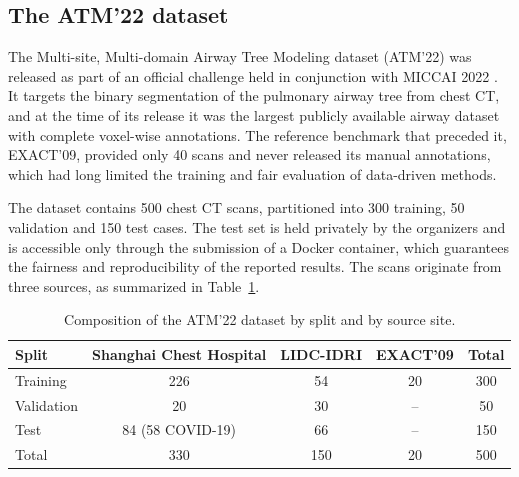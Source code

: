 
\subsection{The ATM'22 dataset}  %
\label{sec:atm22}                %

The Multi-site, Multi-domain Airway Tree Modeling dataset (ATM'22) was released
as part of an official challenge held in conjunction with MICCAI 2022
\cite{zhang2023atm22}. It targets the binary segmentation of the pulmonary
airway tree from chest CT, and at the time of its release it was the largest
publicly available airway dataset with complete voxel-wise annotations. The
reference benchmark that preceded it, EXACT'09, provided only 40 scans and
never released its manual annotations, which had long limited the training and
fair evaluation of data-driven methods.

The dataset contains 500 chest CT scans, partitioned into 300 training, 50
validation and 150 test cases. The test set is held privately by the organizers
and is accessible only through the submission of a Docker container, which
guarantees the fairness and reproducibility of the reported results. The scans
originate from three sources, as summarized in Table~\ref{tab:atm22_split}.

\begin{table}[htbp]              %
  \centering                     %
  \caption{Composition of the ATM'22 dataset by split and by source site.}
  \label{tab:atm22_split}        %
  \begin{tabular}{lcccc}         %
    \toprule
    Split & Shanghai Chest Hospital & LIDC-IDRI & EXACT'09 & Total \\
    \midrule
    Training   & 226                  & 54 & 20 & 300 \\
    Validation & 20                   & 30 & -- & 50  \\
    Test       & 84 (58 COVID-19)     & 66 & -- & 150 \\
    \midrule
    Total      & 330                  & 150 & 20 & 500 \\
    \bottomrule
  \end{tabular}
\end{table}

